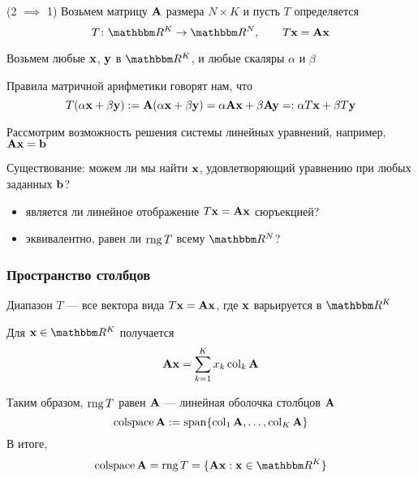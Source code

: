 \begin{frame}
    
    \vspace{2em}
    \Prf (2 $\implies$ 1)
    Возьмем матрицу $\mathbf A$ размера $N \times K$ и пусть $T$ определяется
    \begin{equation*}
        T \colon \RR^K \to \RR^N, 
        \qquad
        T\boldx = \boldA \boldx
    \end{equation*}

    Возьмем любые ${\mathbf x}$, ${\mathbf y}$ в $\RR^K$, и любые скаляры $\alpha$ и $\beta$
     
    \vspace{.7em} 
    Правила матричной арифметики говорят нам, что
    \begin{equation*}
        T(\alpha {\mathbf x} + \beta {\mathbf y}) 
        := \mathbf A (\alpha {\mathbf x} + \beta {\mathbf y})
        = \alpha \mathbf A {\mathbf x}  + \beta \mathbf A {\mathbf y}
        =: \alpha T{\mathbf x} + \beta T{\mathbf y} 
    \end{equation*}
    
\end{frame}

\begin{frame}
    
    \vspace{2em}
    Рассмотрим возможность решения системы линейных уравнений, например, 
    $\mathbf A {\mathbf x} = {\mathbf b}$
    
    \vspace{.7em}
    Существование: можем ли мы найти ${\mathbf x}$, удовлетворяющий уравнению при любых
    заданных ${\mathbf b}$?  
    \begin{itemize}
        \item является ли линейное отображение $T{\mathbf x} = \mathbf A {\mathbf x}$ сюръекцией? 
        \item эквивалентно, равен ли $\operatorname{rng} T$ всему $\RR^N$?
    \end{itemize}
    
\end{frame}


\begin{frame}\frametitle{Пространство столбцов}

    \vspace{2em}
    Диапазон $T$ --- все вектора вида
    $T{\mathbf x} = \mathbf A {\mathbf x}$, где ${\mathbf x}$ варьируется в $\RR^K$
    
    Для $\boldx \in \RR^K$ получается
    \[\mathbf A {\mathbf x} = \sum_{k=1}^K x_k \operatorname{col}_k \mathbf A\]
    
    \vspace{.7em}
    Таким образом, $\operatorname{rng} T$ равен  $\mathbf A$ --- 
    линейная оболочка столбцов $\mathbf A$
    \begin{equation*}
    \label{eq:secolsp}
    \operatorname{colspace} \mathbf A := \operatorname{span} \{ \operatorname{col}_1 \mathbf A, \ldots, \operatorname{col}_K \mathbf A \}
    \end{equation*}
    В итоге, 
    \begin{equation*}
        \colspace \boldA = \range T = \setntn{\boldA \boldx}{ \boldx \in \RR^K}
    \end{equation*}
    
\end{frame}


